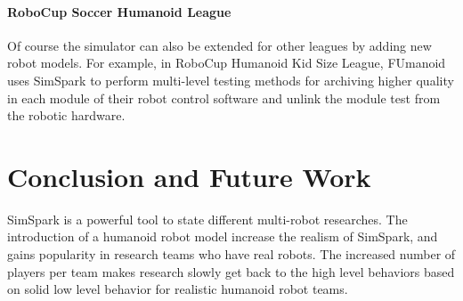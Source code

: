 \documentclass{llncs}
\begin{document}
\paragraph{RoboCup Soccer Humanoid League}
Of course the simulator can also be extended for other leagues by adding new robot models.
For example, in RoboCup Humanoid Kid Size League, FUmanoid\cite{Donat2012} uses
SimSpark to perform multi-level testing methods for archiving higher
quality in each module of their robot control software and unlink the
module test from the robotic hardware.


\section{Conclusion and Future Work}
\label{s:conclusion}
SimSpark is a powerful tool to state different multi-robot researches.
The introduction of a humanoid robot model increase the realism of SimSpark, and gains popularity in research teams who have real robots.
The increased number of players per team makes research slowly get back to the high level behaviors based on solid low level behavior for realistic humanoid robot teams.
\end{document}
